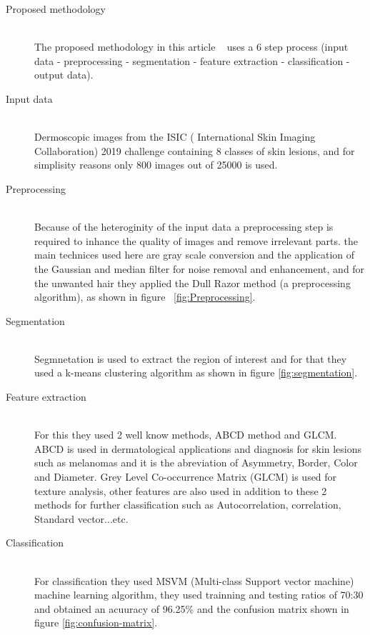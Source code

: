 \begin{description}
    \item [Proposed methodology] \hfill \\
    The proposed methodology in this article ~\cite{Krishna2020} uses a 6 step process (input data - preprocessing - segmentation - feature extraction - classification - output data).
    \item [Input data] \hfill \\ 
        Dermoscopic images from the ISIC ( International Skin Imaging Collaboration) 2019 challenge containing 8 classes of skin lesions, and for simplisity reasons only 800 images out of 25000 is used.
    
    \item [Preprocessing] \hfill \\
        Because of the heteroginity of the input data a preprocessing step is required to inhance the quality of images and remove irrelevant parts. the main technices used here are gray scale conversion and the application of the Gaussian and median filter for noise removal and enhancement, and for the unwanted hair they applied the Dull Razor method (a preprocessing algorithm), as shown in figure ~\ref{fig:Preprocessing}.

    \item [Segmentation] \hfill \\
        Segmnetation is used to extract the region of interest and for that they used a k-means clustering algorithm as shown in figure \ref{fig:segmentation}.
        
    \item [Feature extraction] \hfill \\
        For this they used 2 well know methods, ABCD method and GLCM. ABCD is used in dermatological applications and diagnosis for skin lesions such as melanomas and it is the abreviation of Asymmetry, Border, Color and Diameter. Grey Level Co-occurrence Matrix (GLCM) is used for texture analysis, other features are also used in addition to these 2 methods for further classification such as Autocorrelation, correlation, Standard vector...etc.
    
    \item [Classification] \hfill \\
        For classification they used MSVM (Multi-class Support vector machine) machine learning algorithm, they used trainning and testing ratios of 70:30 and obtained an acuuracy of 96.25\% and the confusion matrix shown in figure \ref{fig:confusion-matrix}.
\end{description}

